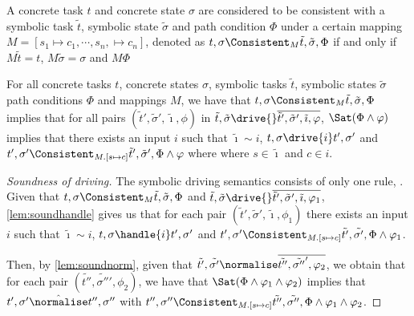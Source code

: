 \begin{definition}
A concrete task $t$ and concrete state $\sigma$
are considered to be consistent with a symbolic task $\tilde{t}$, symbolic state $\tilde{\sigma}$ and path condition $\Phi$
under a certain mapping $M=[s_1\mapsto c_1,\cdots,s_n,\mapsto c_n]$, denoted as $t,\sigma \Consistent_M \tilde{t},\tilde{\sigma},\Phi$
if and only if $M\tilde{t}=t$, $M\tilde{\sigma}=\sigma$ and $M\Phi$
\end{definition}

\begin{lemma}
  \label{lem:sounddriving}
  For all concrete tasks $t$, concrete states $\sigma$, symbolic tasks $\tilde{t}$, symbolic states $\tilde{\sigma}$ path conditions $\Phi$ and mappings $M$,
  we have that $t,\sigma\Consistent_M\tilde{t},\tilde{\sigma},\Phi$ implies
  that for all pairs $(\tilde{t}',\tilde{\sigma}',\tilde{\imath},\phi)$ in $\tilde{t},\tilde{\sigma}\drive{}\overline{\tilde{t}',\tilde{\sigma}',\tilde{\imath},\phi}$,
  $\Sat(\Phi\land\phi)$ implies that there exists an input $i$ such that $\tilde{\imath}\sim i$,  $t,\sigma\drive{i}t',\sigma'$ and $t',\sigma' \Consistent_{M.[s\mapsto c]} \tilde{t}',\tilde{\sigma}',\Phi\land\phi$ where where $s\in\tilde{\imath}$ and $c\in i$.
\end{lemma}

\begin{proof}[Soundness of driving]
  The symbolic driving semantics consists of only one rule, .
  Given that $t,\sigma\Consistent_M\tilde{t},\tilde{\sigma},\Phi$ and $\tilde{t},\tilde{\sigma}\drive{}\overline{\tilde{t}',\tilde{\sigma}',\tilde{\imath},\phi_1}$,
  \cref{lem:soundhandle} gives us that for each pair $(\tilde{t}',\tilde{\sigma}',\tilde{\imath},\phi_1)$
  there exists an input $i$ such that $\tilde{\imath}\sim i$, $t,\sigma\handle{i}t',\sigma'$
  and $t',\sigma'\Consistent_{M.[s\mapsto c]}\tilde{t'},\tilde{\sigma'},\Phi\land\phi_1$.

  Then, by \cref{lem:soundnorm}, given that $\tilde{t'},\tilde{\sigma'}\normalise\overline{\tilde{t''},\tilde{\sigma''}',\phi_2}$,
  we obtain that for each pair $(\tilde{t''},\tilde{\sigma''}',\phi_2)$, we have that $\Sat(\Phi\land\phi_1\land\phi_2)$ implies
  that $t',\sigma'\hat{\normalise}t'',\sigma''$ with $t'',\sigma''\Consistent_{M.[s\mapsto c]}\tilde{t''},\tilde{\sigma''},\Phi\land\phi_1\land\phi_2$.
\end{proof}



